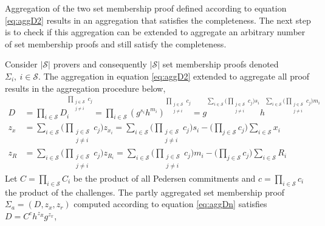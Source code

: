 Aggregation of the two set membership proof defined according to equation  \eqref{eq:aggD2} results in an aggregation that satisfies the  completeness. The next step is to check if this aggregation can be extended to aggregate an arbitrary number of set membership proofs and still satisfy the completeness. 

Consider $|\mathcal{S}|$ provers and consequently  $|\mathcal{S}|$ set membership proofs denoted $\Sigma_i,\: i\in\mathcal{S}$. The aggregation in equation \eqref{eq:aggD2} extended to aggregate all proof results in the aggregation procedure below,
\begin{equation}
\label{eq:aggDn}
\begin{aligned}
D &=\prod_{i\in\mathcal{S}}  D_i ^{\prod_{\substack{j\in\mathcal{S}\\ j\neq i}} c_j }  =  \prod_{i\in\mathcal{S}}  (g^{s_i}h^{m_i}) ^{\prod_{\substack{j\in\mathcal{S}\\ j\neq i}}  c_j } = g ^ {\sum_{i\in\mathcal{S}} \Big(\prod_{\substack{j\in\mathcal{S}\\ j\neq i}}   c_j \Big)s_i} h^ {\sum_{i\in\mathcal{S}} \Big(\prod_{\substack{j\in\mathcal{S}\\ j\neq i}}   c_j \Big)m_i} \\
z_x &= \sum_{i\in\mathcal{S}} \Big( \prod_{\substack{j\in\mathcal{S}\\ j\neq i}} c_j \Big) z_{x_i} = \sum_{i\in\mathcal{S}} \Big( \prod_{\substack{j\in\mathcal{S}\\ j\neq i}} c_j \Big)s_i - \big( \prod_{j\in\mathcal{S}} c_j \big) \sum_{i\in\mathcal{S}} x_i\\
z_R &=  \sum_{i\in\mathcal{S}}  \Big( \prod_{\substack{j\in\mathcal{S}\\ j\neq i}} c_j \Big) z_{R_i} = \sum_{i\in\mathcal{S}} \Big( \prod_{\substack{j\in\mathcal{S}\\ j\neq i}} c_j \Big)m_i - \big( \prod_{j\in\mathcal{S}} c_j \big) \sum_{i\in\mathcal{S}} R_i 
\end{aligned}
\end{equation}
Let $C=\prod_{i\in\mathcal{S}} C_i$ be the product of all Pedersen commitments and $c= \prod_{i\in\mathcal{S}} c_i$ the product of the challenges.  The partly aggregated set membership proof $\Sigma_a = (D,z_x,z_r)$ computed according to equation \ref{eq:aggDn} satisfies $D= C^ch^{z_R}g^{z_x}$, 
